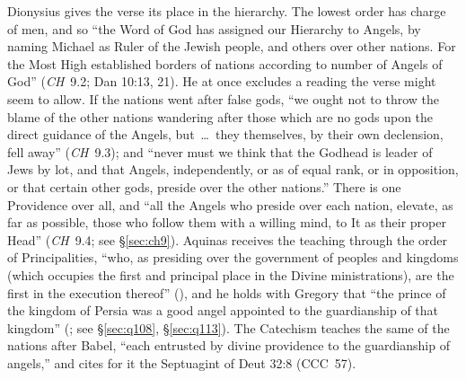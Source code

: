 Dionysius gives the verse its place in the hierarchy. The lowest order has
charge of men, and so ``the Word of God has assigned our Hierarchy to
Angels, by naming Michael as Ruler of the Jewish people, and others over
other nations. For the Most High established borders of nations according
to number of Angels of God'' (\emph{CH}~9.2; Dan 10:13, 21). He at once
excludes a reading the verse might seem to allow. If the nations went
after false gods, ``we ought not to throw the blame of the other nations
wandering after those which are no gods upon the direct guidance of the
Angels, but~\dots\ they themselves, by their own declension, fell away''
(\emph{CH}~9.3); and ``never must we think that the Godhead is leader of Jews
by lot, and that Angels, independently, or as of equal rank, or in
opposition, or that certain other gods, preside over the other nations.''
There is one Providence over all, and ``all the Angels who preside over
each nation, elevate, as far as possible, those who follow them with a
willing mind, to It as their proper Head'' (\emph{CH}~9.4; see
\S\ref{sec:ch9}). Aquinas receives the teaching through the order of
Principalities, ``who, as presiding over the government of peoples and
kingdoms (which occupies the first and principal place in the Divine
ministrations), are the first in the execution thereof'' (), and he holds with Gregory that ``the prince of the kingdom of
Persia was a good angel appointed to the guardianship of that kingdom''
(; see \S\ref{sec:q108}, \S\ref{sec:q113}). The Catechism
teaches the same of the nations after Babel, ``each entrusted by divine
providence to the guardianship of angels,'' and cites for it the Septuagint
of Deut 32:8 (CCC~57).

